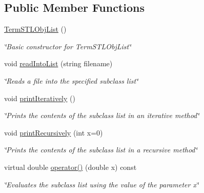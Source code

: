 \subsection*{Public Member Functions}
\begin{DoxyCompactItemize}
\item 
\hypertarget{classTermSTLObjList_a3dddd82683ddc17cc54e565af2ab0e0a}{\hyperlink{classTermSTLObjList_a3dddd82683ddc17cc54e565af2ab0e0a}{Term\-S\-T\-L\-Obj\-List} ()}\label{classTermSTLObjList_a3dddd82683ddc17cc54e565af2ab0e0a}

\begin{DoxyCompactList}\small\item\em \char`\"{}\-Basic constructor for Term\-S\-T\-L\-Obj\-List\char`\"{} \end{DoxyCompactList}\item 
void \hyperlink{classTermSTLObjList_a9797dc26c48d6473785d1de55b9d173f}{read\-Into\-List} (string filename)
\begin{DoxyCompactList}\small\item\em \char`\"{}\-Reads a file into the specified subclass list\char`\"{} \end{DoxyCompactList}\item 
\hypertarget{classTermSTLObjList_a4580b1ad931cb02e96485659be3e42e8}{void \hyperlink{classTermSTLObjList_a4580b1ad931cb02e96485659be3e42e8}{print\-Iteratively} ()}\label{classTermSTLObjList_a4580b1ad931cb02e96485659be3e42e8}

\begin{DoxyCompactList}\small\item\em \char`\"{}\-Prints the contents of the subclass list in an iterative method\char`\"{} \end{DoxyCompactList}\item 
void \hyperlink{classTermSTLObjList_a64b1053185cb942c6c1fa208245d1cbb}{print\-Recursively} (int x=0)
\begin{DoxyCompactList}\small\item\em \char`\"{}\-Prints the contents of the subclass list in a recursive method\char`\"{} \end{DoxyCompactList}\item 
virtual double \hyperlink{classTermSTLObjList_a72df52251f91b4ae3227af24296f0f05}{operator()} (double x) const 
\begin{DoxyCompactList}\small\item\em \char`\"{}\-Evaluates the subclass list using the value of the parameter x\char`\"{} \end{DoxyCompactList}\end{DoxyCompactItemize}


